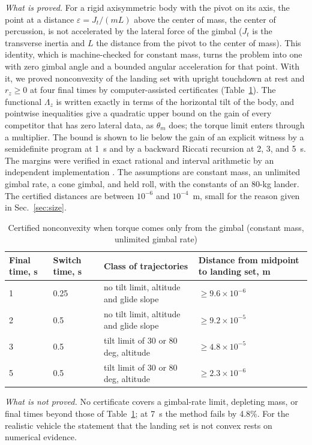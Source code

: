 \emph{What is proved.} For a rigid axisymmetric body with the pivot on its axis, the point at a distance
$\varepsilon=J_t/(mL)$ above the center of mass, the center of percussion, is not accelerated by the lateral force of the
gimbal ($J_t$ is the transverse inertia and $L$ the distance from the pivot to the center of mass). This identity, which is
machine-checked for constant mass, turns the problem into one with zero gimbal angle and a bounded angular acceleration for
that point. With it, we proved nonconvexity of the landing set with upright touchdown at rest and $r_z\ge0$
at four final times by computer-assisted certificates (Table~\ref{tab:tvc}). The functional $\Lambda_z$ is written exactly
in terms of the horizontal tilt of the body, and pointwise inequalities give a quadratic upper bound on the gain of every
competitor that has zero lateral data, as $\theta_m$ does; the torque limit enters through a multiplier. The bound is
shown to lie below the gain of an explicit witness by a semidefinite program at 1~s and by a backward Riccati recursion
at 2, 3, and 5~s. The margins were verified in exact rational and interval arithmetic by an independent implementation
\cite{repo}. The assumptions are constant mass, an unlimited gimbal rate, a cone gimbal, and held
roll, with the constants of an 80-kg lander. The certified distances are between $10^{-6}$ and $10^{-4}$~m, small for the
reason given in Sec.~\ref{sec:size}.

\begin{table}[t]\centering
\caption{Certified nonconvexity when torque comes only from the gimbal (constant mass, unlimited gimbal rate)}\label{tab:tvc}
\small
\begin{tabular}{@{}llll@{}}\toprule
Final time, s & Switch time, s & Class of trajectories & Distance from midpoint to landing set, m \\\midrule
1 & 0.25 & no tilt limit, altitude and glide slope & $\ge9.6\times10^{-6}$ \\
2 & 0.5 & no tilt limit, altitude and glide slope & $\ge9.2\times10^{-5}$ \\
3 & 0.5 & tilt limit of 30 or 80 deg, altitude & $\ge4.8\times10^{-5}$ \\
5 & 0.5 & tilt limit of 30 or 80 deg, altitude & $\ge2.3\times10^{-6}$ \\\bottomrule
\end{tabular}
\end{table}

\emph{What is not proved.} No certificate covers a gimbal-rate limit, depleting mass, or final times beyond those of
Table~\ref{tab:tvc}; at 7~s the method fails by 4.8\%. For the realistic vehicle the statement that the landing set is not
convex rests on numerical evidence.

